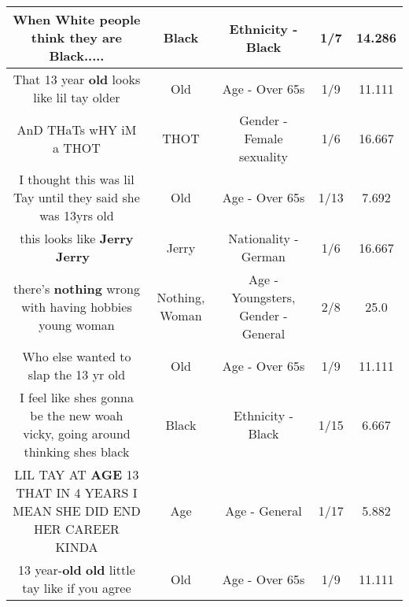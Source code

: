 \documentclass[11pt]{article}
\newlength\mylength
\begin{document}
\begin{center}
\begin{longtable}{|C{.65\mylength}|C{.30\mylength}|C{.12\mylength}|C{.12\mylength}|C{.12\mylength}|}
  \small When White people think they are \textbf{Black}.....\normalsize   & Black & Ethnicity - Black & 1/7 & 14.286 \\  \hline
  \small That 13 year \textbf{old} looks like lil tay older\normalsize   & Old & Age - Over 65s & 1/9 & 11.111 \\  \hline
  \small AnD THaTs wHY iM a THOT\normalsize   & THOT & Gender - Female sexuality & 1/6 & 16.667 \\  \hline
  \small I thought this was lil Tay until they said she was 13yrs old\normalsize   & Old & Age - Over 65s & 1/13 & 7.692 \\  \hline
  \small this looks like \textbf{Jerry} \textbf{Jerry} 🤣\normalsize   & Jerry & Nationality - German & 1/6 & 16.667 \\  \hline
  \small there's \textbf{nothing} wrong with having hobbies young woman\normalsize   & Nothing, Woman & Age - Youngsters, Gender - General & 2/8 & 25.0 \\  \hline
  \small Who else wanted to slap the 13 yr old\normalsize   & Old & Age - Over 65s & 1/9 & 11.111 \\  \hline
  \small I feel like shes gonna be the new woah vicky, going around thinking shes black\normalsize   & Black & Ethnicity - Black & 1/15 & 6.667 \\  \hline
  \small LIL TAY AT \textbf{AGE} 13 THAT IN 4 YEARS I MEAN SHE DID END HER CAREER KINDA\normalsize   & Age & Age - General & 1/17 & 5.882 \\  \hline
  \small 13 year-\textbf{old} \textbf{old} little tay like if you agree\normalsize   & Old & Age - Over 65s & 1/9 & 11.111 \\  \hline

\end{longtable}
\end{center}
\end{document}
